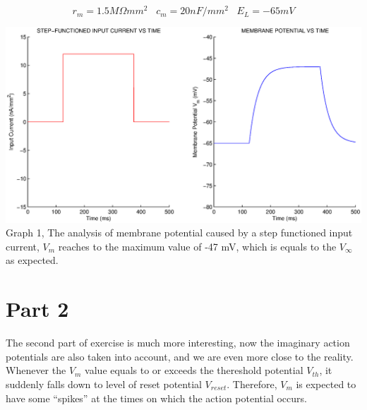 \documentclass{article}
\begin{document}
\begin{equation*}
r_{m}=1.5 M \Omega mm^{2}\,\,\,\,\,c_{m}=20nF/mm^{2}\,\,\,\,\,E_{L}=-65mV
\end{equation*}

\begin{center}
 \includegraphics[width=\textwidth,  bb=0   231   682   610]{Exercise3/q7.eps}
Graph 1, The analysis of membrane potential caused by a step functioned input current, $V_{m}$ reaches to the maximum value of -47 mV, which is equals to the $V_{\infty}$ as expected.
\end{center}


\section*{Part 2}
The second part of exercise is much more interesting, now the imaginary action potentials are also taken into account, and we are even more close to the reality. Whenever the $V_{m}$ value equals to or exceeds the thereshold potential $V_{th}$, it suddenly falls down to level of reset potential $V_{reset}$. Therefore, $V_{m}$ is expected to have some ``spikes'' at the times on which the action potential occurs.
\end{document}

